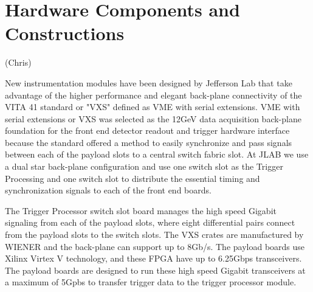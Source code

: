\section{Hardware Components and Constructions}(Chris)


New instrumentation modules have been designed by Jefferson Lab that take advantage of the higher performance and elegant back-plane connectivity of the VITA 41 standard or "VXS" defined as VME with serial extensions. 
VME with serial extensions or VXS was selected as the 12GeV data acquisition back-plane foundation for the front end detector readout and trigger hardware interface because the standard offered a method to easily synchronize and pass signals between each of the payload slots to a central switch fabric slot. At JLAB we use a dual star back-plane configuration and use one switch slot as the Trigger Processing and one switch slot to distribute the essential timing and synchronization signals to each of the front end boards.

The Trigger Processor switch slot board manages the high speed Gigabit signaling from each of the payload slots, where eight differential pairs connect from the payload slots to the switch slots. The VXS crates are manufactured by WIENER and the back-plane can support up to 8Gb/s. The payload boards use Xilinx Virtex V technology, and these FPGA have up to 6.25Gbps transceivers. The payload boards are designed to run these high speed Gigabit transceivers at a maximum of 5Gpbs to transfer trigger data to the trigger processor module. 

